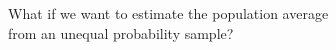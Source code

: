 \documentclass{beamer}
\begin{document}
\begin{frame}

What if we want to estimate the population average\\
from an unequal probability sample?

\begin{center}
\end{center}
\end{frame}
\end{document}
